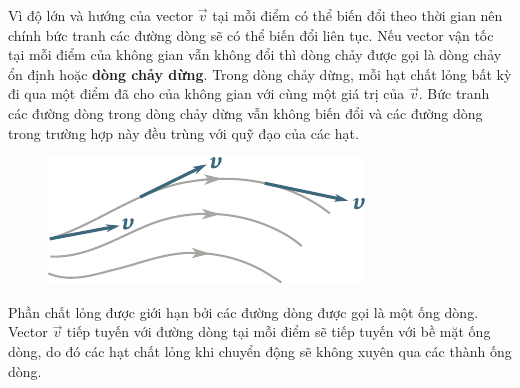 Vì độ lớn và hướng của vector $\vec{v}$ tại mỗi điểm có thể biến đổi theo thời gian nên chính bức tranh các đường dòng sẽ có thể biến đổi liên tục. Nếu vector vận tốc tại mỗi điểm của không gian vẫn không đổi thì dòng chảy được gọi là dòng chảy ổn định hoặc \textbf{dòng chảy dừng}. Trong dòng chảy dừng, mỗi hạt chất lỏng bất kỳ đi qua một điểm đã cho của không gian với cùng một giá trị của $\vec{v}$. Bức tranh các đường dòng trong dòng chảy dừng vẫn không biến đổi và các đường dòng trong trường hợp này đều trùng với quỹ đạo của các hạt.

\begin{figure}[!htb]
	\begin{center}
		\includegraphics[scale=1.0]{figures/ch_09/fig_9_1.pdf}
		\caption[]{}
		\label{fig:9_1}
	\end{center}
	\vspace{-0.8cm}
\end{figure}


Phần chất lỏng được giới hạn bởi các đường dòng được gọi là một ống dòng. Vector $\vec{v}$ tiếp tuyến với đường dòng tại mỗi điểm sẽ tiếp tuyến với bề mặt ống dòng, do đó các hạt chất lỏng khi chuyển động sẽ không xuyên qua các thành ống dòng.


